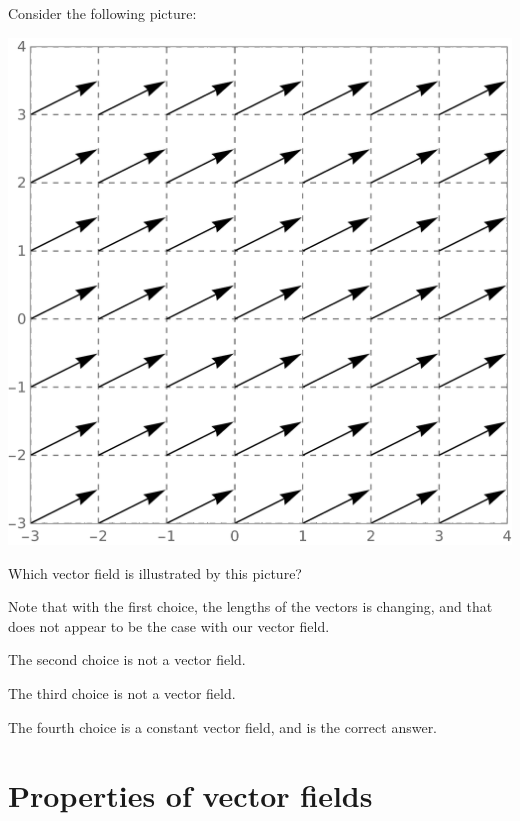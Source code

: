 \documentclass{ximera}
\begin{document}
\begin{question}
  Consider the following picture:
  \begin{image}
    \includegraphics{constField.png}
  \end{image}
  Which vector field is illustrated by this picture?
  \begin{multipleChoice}
  \end{multipleChoice}
  \begin{feedback}[correct]
    Note that with the first choice, the lengths of the vectors is
    changing, and that does not appear to be the case with our vector
    field.

    The second choice is not a vector field.

    The third choice is not a vector field.

    The fourth choice is a constant vector field, and is the correct answer. 
  \end{feedback}
\end{question}



\section{Properties of vector fields}
\end{document}
